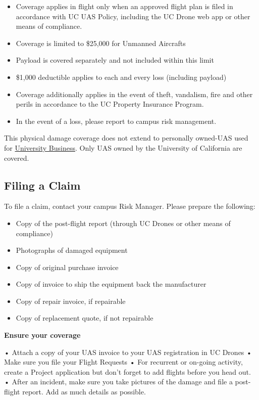 \documentclass[
]{book}
\providecommand{\tightlist}{%
  \setlength{\itemsep}{0pt}\setlength{\parskip}{0pt}}
\begin{document}
\begin{itemize}
\tightlist
\item
  Coverage applies in flight only when an approved flight plan is filed in accordance with UC UAS Policy, including the UC Drone web app or other means of compliance.\\
\item
  Coverage is limited to \$25,000 for Unmanned Aircrafts
\item
  Payload is covered separately and not included within this limit
\item
  \$1,000 deductible applies to each and every loss (including payload)
\item
  Coverage additionally applies in the event of theft, vandalism, fire and other perils in accordance to the UC Property Insurance Program.
\item
  In the event of a loss, please report to campus risk management.
\end{itemize}

This physical damage coverage does not extend to personally owned-UAS used for \protect\hyperlink{UB}{University Business}. Only UAS owned by the University of California are covered.

\hypertarget{filing-a-claim}{%
\subsection{Filing a Claim}\label{filing-a-claim}}

To file a claim, contact your campus Risk Manager. Please prepare the following:

\begin{itemize}
\tightlist
\item
  Copy of the post-flight report (through UC Drones or other means of compliance)
\item
  Photographs of damaged equipment
\item
  Copy of original purchase invoice
\item
  Copy of invoice to ship the equipment back the manufacturer
\item
  Copy of repair invoice, if repairable
\item
  Copy of replacement quote, if not repairable
\end{itemize}

\textbf{Ensure your coverage}

• Attach a copy of your UAS invoice to your UAS registration in UC Drones
• Make sure you file your Flight Requests
• For recurrent or on-going activity, create a Project application but don't forget to add flights before you head out.
• After an incident, make sure you take pictures of the damage and file a post-flight report. Add as much details as possible.
\end{document}
